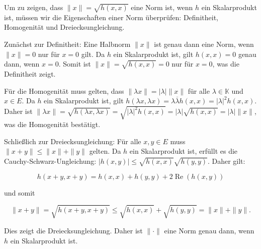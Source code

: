 Um zu zeigen, dass $\|x\| = \sqrt{h(x, x)}$ eine Norm ist, wenn $h$ ein Skalarprodukt ist, müssen wir die Eigenschaften einer Norm überprüfen: Definitheit, Homogenität und Dreiecksungleichung.

Zunächst zur Definitheit: Eine Halbnorm $\|x\|$ ist genau dann eine Norm, wenn $\|x\| = 0$ nur für $x = 0$ gilt. Da $h$ ein Skalarprodukt ist, gilt $h(x, x) = 0$ genau dann, wenn $x = 0$. Somit ist $\|x\| = \sqrt{h(x, x)} = 0$ nur für $x = 0$, was die Definitheit zeigt.

Für die Homogenität muss gelten, dass $\|\lambda x\| = |\lambda| \|x\|$ für alle $\lambda \in \mathbb{K}$ und $x \in E$. Da $h$ ein Skalarprodukt ist, gilt $h(\lambda x, \lambda x) = \lambda \overline{\lambda} h(x, x) = |\lambda|^2 h(x, x)$. Daher ist $\|\lambda x\| = \sqrt{h(\lambda x, \lambda x)} = \sqrt{|\lambda|^2 h(x, x)} = |\lambda| \sqrt{h(x, x)} = |\lambda| \|x\|$, was die Homogenität bestätigt.

Schließlich zur Dreiecksungleichung: Für alle $x, y \in E$ muss $\|x + y\| \leq \|x\| + \|y\|$ gelten. Da $h$ ein Skalarprodukt ist, erfüllt es die Cauchy-Schwarz-Ungleichung: $|h(x, y)| \leq \sqrt{h(x, x)} \sqrt{h(y, y)}$. Daher gilt:

\[
h(x+y, x+y) = h(x, x) + h(y, y) + 2 \operatorname{Re}(h(x, y))
\]

und somit

\[
\|x+y\| = \sqrt{h(x+y, x+y)} \leq \sqrt{h(x, x)} + \sqrt{h(y, y)} = \|x\| + \|y\|.
\]

Dies zeigt die Dreiecksungleichung. Daher ist $\|\cdot\|$ eine Norm genau dann, wenn $h$ ein Skalarprodukt ist.